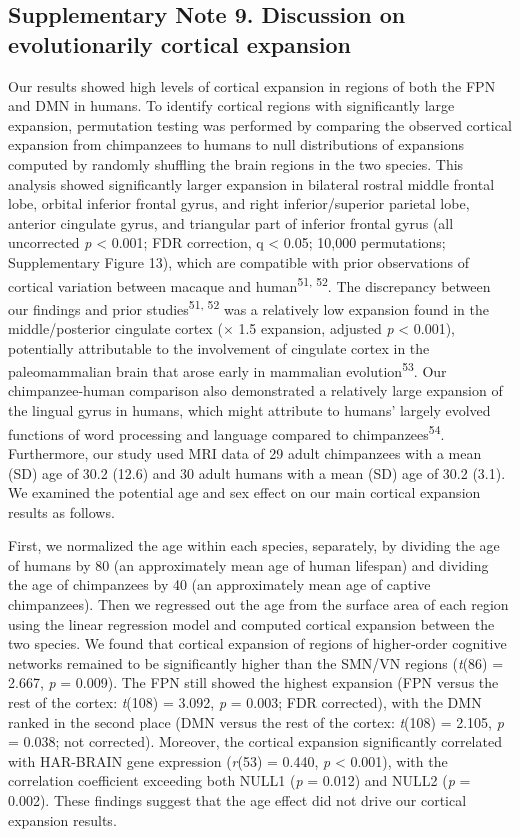 \begin{refsection}
\subsection*{Supplementary Note 9. Discussion on evolutionarily cortical expansion}
Our results showed high levels of cortical expansion in regions of both the FPN and DMN in humans. To identify cortical regions with significantly large expansion, permutation testing was performed by comparing the observed cortical expansion from chimpanzees to humans to null distributions of expansions computed by randomly shuffling the brain regions in the two species. This analysis showed significantly larger expansion in bilateral rostral middle frontal lobe, orbital inferior frontal gyrus, and right inferior/superior parietal lobe, anterior cingulate gyrus, and triangular part of inferior frontal gyrus (all uncorrected \textit{p} < 0.001; FDR correction, q < 0.05; 10,000 permutations; Supplementary Figure 13), which are compatible with prior observations of cortical variation between macaque and human\textsuperscript{51, 52}. The discrepancy between our findings and prior studies\textsuperscript{51, 52} was a relatively low expansion found in the middle/posterior cingulate cortex ($ \times $ 1.5 expansion, adjusted \textit{p} < 0.001), potentially attributable to the involvement of cingulate cortex in the paleomammalian brain that arose early in mammalian evolution\textsuperscript{53}. Our chimpanzee-human comparison also demonstrated a relatively large expansion of the lingual gyrus in humans, which might attribute to humans’ largely evolved functions of word processing and language compared to chimpanzees\textsuperscript{54}. Furthermore, our study used MRI data of 29 adult chimpanzees with a mean (SD) age of 30.2 (12.6) and 30 adult humans with a mean (SD) age of 30.2 (3.1). We examined the potential age and sex effect on our main cortical expansion results as follows.

First, we normalized the age within each species, separately, by dividing the age of humans by 80 (an approximately mean age of human lifespan) and dividing the age of chimpanzees by 40 (an approximately mean age of captive chimpanzees). Then we regressed out the age from the surface area of each region using the linear regression model and computed cortical expansion between the two species. We found that cortical expansion of regions of higher-order cognitive networks remained to be significantly higher than the SMN/VN regions (\textit{t}(86) = 2.667, \textit{p} = 0.009). The FPN still showed the highest expansion (FPN versus the rest of the cortex: \textit{t}(108) = 3.092, \textit{p} = 0.003; FDR corrected), with the DMN ranked in the second place (DMN versus the rest of the cortex: \textit{t}(108) = 2.105, \textit{p} = 0.038; not corrected). Moreover, the cortical expansion significantly correlated with HAR-BRAIN gene expression (\textit{r}(53) = 0.440, \textit{p} < 0.001), with the correlation coefficient exceeding both NULL1 (\textit{p} = 0.012) and NULL2 (\textit{p} = 0.002). These findings suggest that the age effect did not drive our cortical expansion results.


\end{refsection}
